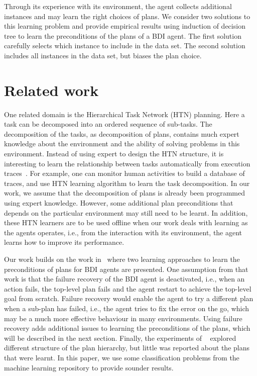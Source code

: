 \documentclass{article}
\begin{document}
Through its experience with its environment, the agent collects
additional instances and may learn the right choices of plans. We
consider two solutions to this learning problem and provide empirical
results using induction of decision tree to learn the preconditions of
the plans of a BDI agent.  The first solution carefully selects which
instance to include in the data set. The second solution includes all
instances in the data set, but biases the plan choice. 


\section{Related work}

One related domain is the Hierarchical Task Network (HTN) planning. Here a task can be decomposed into an ordered sequence of sub-tasks.  The decomposition of the tasks, as decomposition of plans, contains much expert knowledge about the environment and the ability of solving problems in this environment. Instead of using expert to design the HTN structure, it is interesting to learn the relationship between tasks automatically from execution traces~\cite{Zhuo09:Learning,Ilghami05:Learning,Hogg08:htnmaker}. For example, one can monitor human activities to build a database of traces, and use HTN learning algorithm to learn the task decomposition. In our work, we assume that the decomposition of plans is already been programmed using expert knowledge. However, some additional plan preconditions that depends on the particular environment may still need to be learnt. In addition, these HTN learners are to be used offline when our work deals with learning as the agents operates, i.e., from the interaction with its environment, the agent learns how to improve its performance.

Our work builds on the work in~\cite{Singh10:Learning} where two learning approaches to learn the preconditions of plans for BDI agents are presented.  One assumption from that work is that the failure recovery of the BDI agent is deactivated, i.e., when an action fails, the top-level plan fails and the agent restart to achieve the top-level goal from scratch. Failure recovery would enable the agent to try a different plan when a sub-plan has failed, i.e., the agent tries to fix the error on the go, which may be a much more effective behaviour in many environments. Using failure recovery adds additional issues to learning the preconditions of the plans, which will be described in the next section. Finally, the experiments of ~\cite{Singh10:Learning} explored different structure of the plan hierarchy, but little was reported about the plans that were learnt. In this paper, we use some classification problems from the machine learning repository to provide sounder results.
\end{document}
